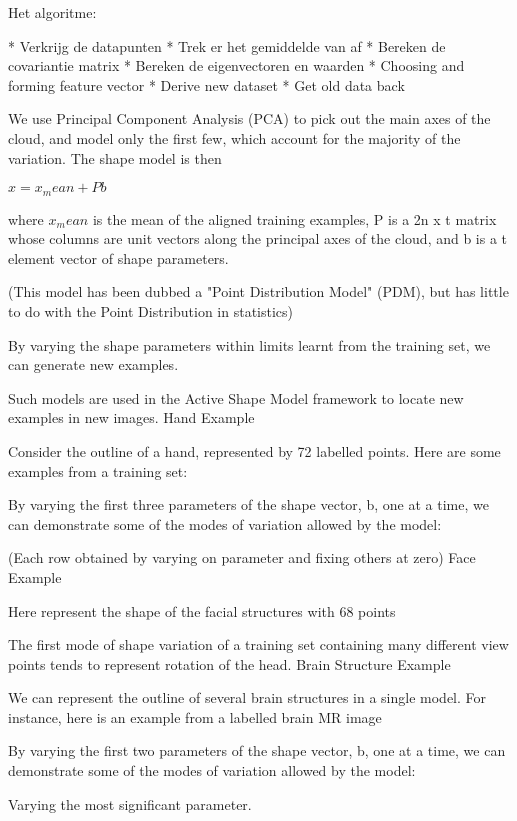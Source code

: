 Het algoritme:

    * Verkrijg de datapunten
    * Trek er het gemiddelde van af
    * Bereken de covariantie matrix
    * Bereken de eigenvectoren en waarden
    * Choosing and forming feature vector
    * Derive new dataset
    * Get old data back 
    
    
We use Principal Component Analysis (PCA) to pick out the main axes of the cloud, and model only the first few, which account for the majority of the variation.
The shape model is then

$x = x_mean + Pb$

where $x_mean$ is the mean of the aligned training examples, P is a 2n x t matrix whose columns are unit vectors along the principal axes of the cloud, and b is a t element vector of shape parameters.

(This model has been dubbed a "Point Distribution Model" (PDM), but has little to do with the Point Distribution in statistics)

By varying the shape parameters within limits learnt from the training set, we can generate new examples.

Such models are used in the Active Shape Model framework to locate new examples in new images.
Hand Example

Consider the outline of a hand, represented by 72 labelled points.
Here are some examples from a training set:

By varying the first three parameters of the shape vector, b, one at a time, we can demonstrate some of the modes of variation allowed by the model:

(Each row obtained by varying on parameter and fixing others at zero)
Face Example

Here represent the shape of the facial structures with 68 points

The first mode of shape variation of a training set containing many different view points tends to represent rotation of the head.
Brain Structure Example

We can represent the outline of several brain structures in a single model.
For instance, here is an example from a labelled brain MR image

By varying the first two parameters of the shape vector, b, one at a time, we can demonstrate some of the modes of variation allowed by the model:

Varying the most significant parameter.

